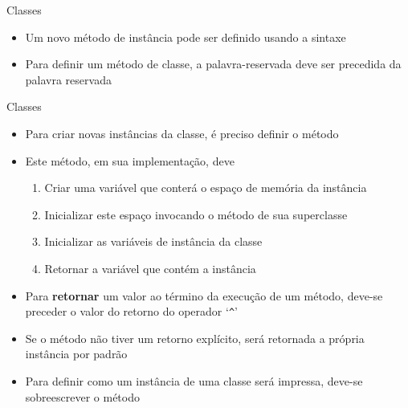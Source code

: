\begin{frame}[fragile]{Classes}

    \begin{itemize}
        \item Um novo método de instância pode ser definido usando a  sintaxe


        \item Para definir um método de classe, a palavra-reservada  deve
            ser precedida da palavra reservada 

    \end{itemize}

\end{frame}
\begin{frame}[fragile]{Classes}

    \begin{itemize}
        \item Para criar novas instâncias da classe, é preciso definir o método 

        \item Este método, em sua implementação, deve
        \begin{enumerate}
            \item Criar uma variável que conterá o espaço de memória da instância
            \item Inicializar este espaço invocando o método  de sua
                superclasse
            \item Inicializar as variáveis de instância da classe
            \item Retornar a variável que contém a instância
        \end{enumerate}

        \item Para \textbf{retornar} um valor ao término da execução de um método, deve-se
            preceder o valor do retorno do operador `\texttt{\^}'

        \item Se o método não tiver um retorno explícito, será retornada a própria instância por
            padrão

        \item Para definir como um instância de uma classe será impressa, deve-se sobreescrever
            o método 

    \end{itemize}

\end{frame}

